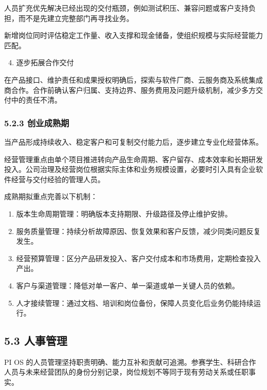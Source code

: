人员扩充优先解决已经出现的交付瓶颈，例如测试积压、兼容问题或客户支持负担，而不是先建立完整部门再寻找业务。

新增岗位同时评估稳定工作量、收入支撑和现金储备，使组织规模与实际经营能力匹配。

\begin{enumerate}

\setcounter{enumi}{3}
\item
  逐步拓展合作交付
\end{enumerate}

在产品接口、维护责任和成果授权明确后，探索与软件厂商、云服务商及系统集成商合作。合作前确认客户归属、支持边界、服务费用及问题升级机制，减少多方交付中的责任不清。

\subsubsection{5.2.3 创业成熟期}\label{ux521bux4e1aux6210ux719fux671f}

当产品形成持续收入、稳定客户和可复制交付能力后，逐步建立专业化经营体系。

经营管理重点由单个项目推进转向产品生命周期、客户留存、成本效率和长期研发投入。公司治理及经营岗位根据实际主体和业务规模设置，必要时引入具有企业软件经营与交付经验的管理人员。

成熟期拟重点完善以下机制：

\begin{enumerate}

\item
  版本生命周期管理：明确版本支持期限、升级路径及停止维护安排。
\item
  服务质量管理：持续分析故障原因、恢复效果和客户反馈，减少同类问题反复发生。
\item
  经营预算管理：区分产品研发投入、客户交付成本和市场费用，定期检查投入产出。
\item
  客户与渠道管理：降低对单一客户、单一渠道或单一关键人员的依赖。
\item
  人才接续管理：通过文档、培训和岗位备份，保障人员变化后业务仍能持续运行。
\end{enumerate}

\subsection{5.3 人事管理}\label{ux4ebaux4e8bux7ba1ux7406}

PI OS 的人员管理坚持职责明确、能力互补和贡献可追溯。参赛学生、科研合作人员与未来经营团队的身份分别记录，岗位规划不等同于现有劳动关系或任职事实。


